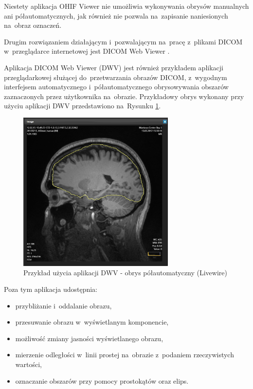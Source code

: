 \documentclass[a4paper,11pt,twoside,openright]{report}
\theoremstyle{definition}
\begin{document}
Niestety aplikacja OHIF Viewer nie umożliwia wykonywania obrysów manualnych ani półautomatycznych,
jak również nie pozwala na~zapisanie naniesionych na~obraz oznaczeń.

Drugim rozwiązaniem działającym i~pozwalającym na~pracę z~plikami DICOM w~przeglądarce
internetowej jest DICOM Web Viewer \cite{DWV}.

Aplikacja DICOM Web Viewer (DWV) jest również przykładem aplikacji
przeglądarkowej służącej do~przetwarzania obrazów DICOM, z~wygodnym interfejsem
automatycznego i~półautomatycznego obrysowywania obszarów zaznaczonych
przez użytkownika na~obrazie. Przykładowy obrys wykonany przy użyciu aplikacji
DWV przedstawiono na~Rysunku \ref{fig:DWV-interface}.

\begin{figure}[tb!]
	\center
	\includegraphics[width=0.7\textwidth]{DWV-interface}
	\caption{Przykład użycia aplikacji DWV - obrys półautomatyczny (Livewire) \cite{DWV}}
    	\label{fig:DWV-interface}
\end{figure}

 Poza tym aplikacja udostępnia:
\begin{itemize}[noitemsep]
\item przybliżanie i~oddalanie obrazu,
\item przesuwanie obrazu w~wyświetlanym komponencie,
\item możliwość zmiany jasności wyświetlanego obrazu,
\item mierzenie odległości w~linii prostej na~obrazie z~podaniem rzeczywistych wartości,
\item oznaczanie obszarów przy pomocy prostokątów oraz elips.
\end{itemize}
\end{document}
